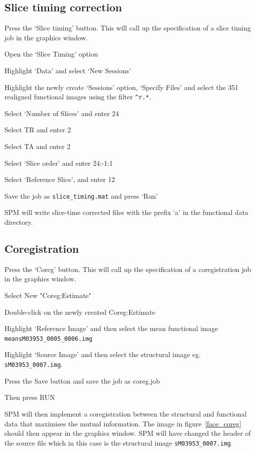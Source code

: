 \subsection{Slice timing correction}

Press the `Slice timing' button. This will call up the specification of a slice timing job in the graphics window. 

\bi
\item{Open the `Slice Timing' option}
\item{Highlight `Data' and select `New Sessions'}
\item{Highlight the newly create `Sessions' option, `Specify Files' and select the 351 realigned functional images using the filter \verb!^r.*!.}
\item{Select `Number of Slices' and enter 24}
\item{Select TR and enter 2}
\item{Select TA and enter 2}
\item{Select `Slice order' and enter 24:-1:1}
\item{Select `Reference Slice', and enter 12}
\item{Save the job as \verb!slice_timing.mat! and press `Run'}
\ei

SPM will write slice-time corrected files with the prefix `a' in the functional data directory.

\subsection{Coregistration}

Press the `Coreg' button. This will call up the specification of a coregistration job in the graphics window. 

\bi
\item{Select New "Coreg:Estimate"}
\item{Double-click on the newly created Coreg:Estimate}
\item{Highlight `Reference Image' and then select the mean functional image \verb!meansM03953_0005_0006.img!}
\item{Highlight `Source Image' and then select the structural image eg. \verb!sM03953_0007.img!.}
\item{Press the Save button and save the job as {\sf coreg.job}}
\item{Then press RUN}
\ei

SPM will then implement a coregistration between the structural and functional data that maximises the mutual information. The image in figure~\ref{face_coreg} should then appear in the graphics window. SPM will have changed the header of the source file which in this case is the structural image \verb!sM03953_0007.img!.

